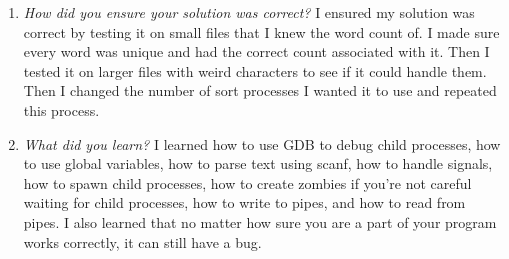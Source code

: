 \documentclass[letterpaper,10pt,titlepage]{article}
\begin{document}
\begin{enumerate}
\begin{enumerate}
	\item \emph{How did you ensure your solution was correct?}
I ensured my solution was correct by testing it on small files that I knew the word count of. I made sure every word was unique and had the correct count associated with it. Then I tested it on larger files with weird characters to see if it could handle them. Then I changed the number of sort processes I wanted it to use and repeated this process.

	\item \emph{What did you learn?}
I learned how to use GDB to debug child processes, how to use global variables, how to parse text using scanf, how to handle signals, how to spawn child processes, how to create zombies if you're not careful waiting for child processes, how to write to pipes, and how to read from pipes. I also learned that no matter how sure you are a part of your program works correctly, it can still have a bug.
	\end{enumerate}
\end{enumerate}

%
\end{document}

